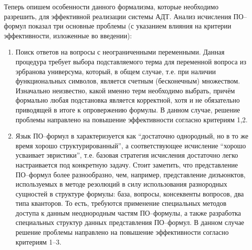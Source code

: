 Теперь опишем особенности данного формализма, которые необходимо разрешить, для эффективной реализации системы АДТ.
Анализ исчисления ПО--формул показал три основные проблемы (с указанием влияния на критерии эффективности, изложенные во введении):
\begin{enumerate}
\item {Поиск ответов на вопросы с неограниченными переменными.} Данная процедура требует выбора подставляемого терма для переменной вопроса из эрбранова универсума, который, в общем случае, т.е. при наличии функциональных символов, является счетным (бесконечным) множеством. Изначально неизвестно, какой именно терм необходимо выбрать, причём формально любая подстановка является корректной, хотя и не обязательно приводящей в итоге к опровержению формулы. В данном случае, решение проблемы направлено на повышение эффективности согласно критериям 1,2.


\item Язык ПО--формул в \cite{ICDS2000} характеризуется как ``достаточно   однородный, но в то же время хорошо структурированный'', а соответствующее исчисление  ``хорошо усваивает эвристики'', т.е. базовая стратегия исчисления достаточно легко настраивается под конкретную задачу. Стоит заметить, что представление ПО--формул более разнообразно, чем, например, представление дизъюнктов, используемых в методе резолюций в силу использования разнородных сущностей в структуре формулы: база, вопросы, консеквенты вопросов, два типа кванторов. То есть, требуются применение специальных методов доступа к данным неоднородным частям ПО--формулы, а также разработка специальных структур данных представления ПО--формул. В данном случае решение проблемы направлено на повышение эффективности согласно критериям 1--3.


\end{enumerate}
